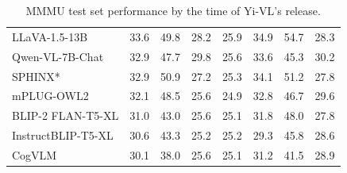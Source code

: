\begin{table}[t!]
\begin{tabular}{@{}lccccccc@{}}
LLaVA-1.5-13B            & 33.6             & 49.8                   & 28.2              & 25.9             & 34.9                        & 54.7                         & 28.3                   \\
Qwen-VL-7B-Chat          & 32.9             & 47.7                   & 29.8              & 25.6             & 33.6                        & 45.3                         & 30.2                   \\
SPHINX*                  & 32.9             & 50.9                   & 27.2              & 25.3             & 34.1                        & 51.2                         & 27.8                   \\
mPLUG-OWL2              & 32.1             & 48.5                   & 25.6              & 24.9             & 32.8                        & 46.7                         & 29.6                   \\
BLIP-2 FLAN-T5-XL        & 31.0             & 43.0                   & 25.6              & 25.1             & 31.8                        & 48.0                         & 27.8                   \\
InstructBLIP-T5-XL       & 30.6             & 43.3                   & 25.2              & 25.2             & 29.3                        & 45.8                         & 28.6                   \\
CogVLM                   & 30.1             & 38.0                   & 25.6              & 25.1             & 31.2                        & 41.5                         & 28.9                   \\ \bottomrule
\end{tabular}
\caption{\label{tab:yi_vl_mmmu}MMMU test set
 performance by the time of Yi-VL's release.}
\end{table}

